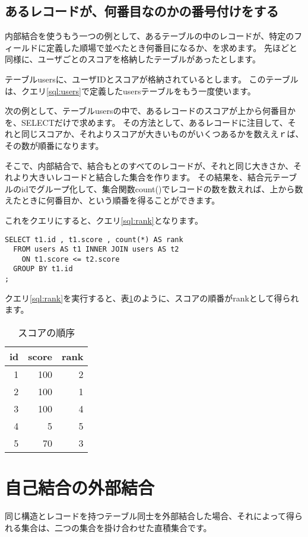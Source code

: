 \subsection{あるレコードが、何番目なのかの番号付けをする}

内部結合を使うもう一つの例として、あるテーブルの中のレコードが、特定のフィールドに定義した順場で並べたとき何番目になるか、を求めます。
先ほどと同様に、ユーザごとのスコアを格納したテーブルがあったとします。

テーブルusersに、ユーザIDとスコアが格納されているとします。
このテーブルは、クエリ\ref{sql:users}で定義したusersテーブルをもう一度使います。

次の例として、テーブルusersの中で、あるレコードのスコアが上から何番目かを、SELECTだけで求めます。
その方法として、あるレコードに注目して、それと同じスコアか、それよりスコアが大きいものがいくつあるかを数ええｒば、その数が順番になります。

そこで、内部結合で、結合もとのすべてのレコードが、それと同じ大きさか、それより大きいレコードと結合した集合を作ります。
その結果を、結合元テーブルのidでグループ化して、集合関数count()でレコードの数を数えれば、上から数えたときに何番目か、という順番を得ることができます。

これをクエリにすると、クエリ\ref{sql:rank}となります。

\begin{lstlisting}[caption=スコアの順位を求める,label=sql:rank]
SELECT t1.id , t1.score , count(*) AS rank
  FROM users AS t1 INNER JOIN users AS t2
    ON t1.score <= t2.score
  GROUP BY t1.id
;
\end{lstlisting}


クエリ\ref{sql:rank}を実行すると、表\ref{table:rank}のように、スコアの順番がrankとして得られます。

\begin{table}[htbp]
  \begin{tabular}{|r|r|r|} \hline
    id & score & rank \\ \hline \hline  
    1 & 100 & 2 \\
    2 & 100 & 1 \\
    3 & 100 & 4 \\ 
    4 & 5 & 5 \\
    5 & 70 & 3 \\\hline
  \end{tabular}
  \caption{スコアの順序}
  \label{table:rank}
\end{table}



\section{自己結合の外部結合}
同じ構造とレコードを持つテーブル同士を外部結合した場合、それによって得られる集合は、二つの集合を掛け合わせた直積集合です。

